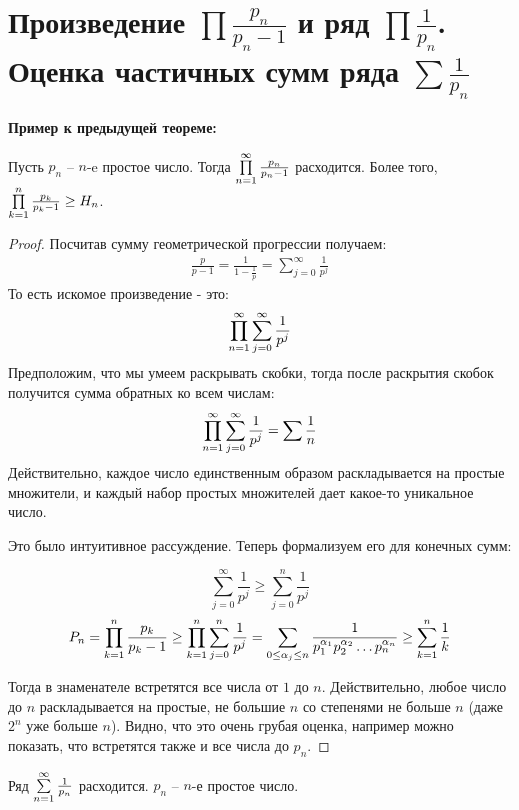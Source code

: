 \section{Произведение $\prod \frac{p_n}{p_n - 1}$ и ряд $\prod \frac{1}{p_n}$. Оценка частичных сумм ряда $\sum \frac{1}{p_n}$}
\textbf{Пример к предыдущей теореме:}

Пусть $p_n$ -- $n$-e простое число. Тогда $\prod \limits_{n=1}^\infty \frac{p_n}{p_n - 1}$ расходится.
Более того, $\prod \limits_{k=1}^n \frac{p_k}{p_k - 1} \geq H_n$.

\begin{proof}
    Посчитав сумму геометрической прогрессии получаем:
    \begin{gather*}
        \frac{p}{p-1} = \frac{1}{1-\frac{1}{p}} = \sum \limits_{j=0}^\infty \frac{1}{p^j}
    \end{gather*}
    То есть искомое произведение - это:
    \begin{gather*}
        \prod \limits_{n=1}^\infty \sum \limits_{j=0}^\infty \frac{1}{p^j}
    \end{gather*}
    Предположим, что мы умеем раскрывать скобки, тогда после раскрытия скобок получится сумма обратных ко всем числам:
    \begin{gather*}
        \prod \limits_{n=1}^\infty \sum \limits_{j=0}^\infty \frac{1}{p^j} = \sum \frac{1}{n}
    \end{gather*}
    Действительно, каждое число единственным образом раскладывается на простые множители, и каждый набор простых множителей дает какое-то уникальное число.

    Это было интуитивное рассуждение. Теперь формализуем его для конечных сумм:

    \[\sum \limits_{j=0}^\infty \frac{1}{p^j} \geq \sum \limits_{j=0}^n \frac{1}{p^j}\]
    \[P_n = \prod \limits_{k=1}^n \frac{p_k}{p_k - 1} \geq \prod \limits_{k=1}^n \sum \limits_{j=0}^n \frac{1}{p^j} = 
    \sum_{0 \leq \alpha_j \leq n} \frac{1}{p_1^{\alpha_1}p_2^{\alpha_2}\ldots p_n^{\alpha_n}} \geq \sum \limits_{k=1}^n \frac{1}{k} \]

    Тогда в знаменателе встретятся все числа от $1$ до $n$. Действительно, любое число до $n$ раскладывается на простые,
    не большие $n$ со степенями не больше $n$ (даже $2^n$ уже больше $n$). Видно, что это очень грубая оценка, например можно
    показать, что встретятся также и все числа до $p_n$.
\end{proof}

\begin{theorem}
    Ряд $\sum \limits_{n=1}^\infty \frac{1}{p_n}$ расходится. $p_n$ -- $n$-е простое число.
\end{theorem}

